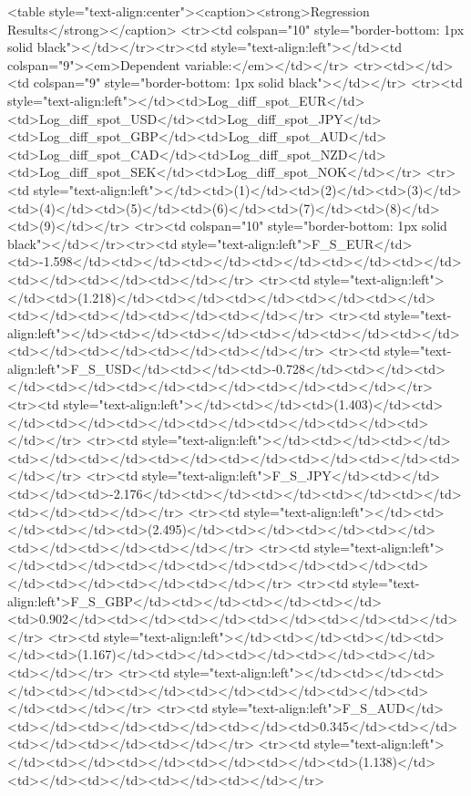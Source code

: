 <table style="text-align:center"><caption><strong>Regression Results</strong></caption>
<tr><td colspan="10" style="border-bottom: 1px solid black"></td></tr><tr><td style="text-align:left"></td><td colspan="9"><em>Dependent variable:</em></td></tr>
<tr><td></td><td colspan="9" style="border-bottom: 1px solid black"></td></tr>
<tr><td style="text-align:left"></td><td>Log_diff_spot_EUR</td><td>Log_diff_spot_USD</td><td>Log_diff_spot_JPY</td><td>Log_diff_spot_GBP</td><td>Log_diff_spot_AUD</td><td>Log_diff_spot_CAD</td><td>Log_diff_spot_NZD</td><td>Log_diff_spot_SEK</td><td>Log_diff_spot_NOK</td></tr>
<tr><td style="text-align:left"></td><td>(1)</td><td>(2)</td><td>(3)</td><td>(4)</td><td>(5)</td><td>(6)</td><td>(7)</td><td>(8)</td><td>(9)</td></tr>
<tr><td colspan="10" style="border-bottom: 1px solid black"></td></tr><tr><td style="text-align:left">F_S_EUR</td><td>-1.598</td><td></td><td></td><td></td><td></td><td></td><td></td><td></td><td></td></tr>
<tr><td style="text-align:left"></td><td>(1.218)</td><td></td><td></td><td></td><td></td><td></td><td></td><td></td><td></td></tr>
<tr><td style="text-align:left"></td><td></td><td></td><td></td><td></td><td></td><td></td><td></td><td></td><td></td></tr>
<tr><td style="text-align:left">F_S_USD</td><td></td><td>-0.728</td><td></td><td></td><td></td><td></td><td></td><td></td><td></td></tr>
<tr><td style="text-align:left"></td><td></td><td>(1.403)</td><td></td><td></td><td></td><td></td><td></td><td></td><td></td></tr>
<tr><td style="text-align:left"></td><td></td><td></td><td></td><td></td><td></td><td></td><td></td><td></td><td></td></tr>
<tr><td style="text-align:left">F_S_JPY</td><td></td><td></td><td>-2.176</td><td></td><td></td><td></td><td></td><td></td><td></td></tr>
<tr><td style="text-align:left"></td><td></td><td></td><td>(2.495)</td><td></td><td></td><td></td><td></td><td></td><td></td></tr>
<tr><td style="text-align:left"></td><td></td><td></td><td></td><td></td><td></td><td></td><td></td><td></td><td></td></tr>
<tr><td style="text-align:left">F_S_GBP</td><td></td><td></td><td></td><td>0.902</td><td></td><td></td><td></td><td></td><td></td></tr>
<tr><td style="text-align:left"></td><td></td><td></td><td></td><td>(1.167)</td><td></td><td></td><td></td><td></td><td></td></tr>
<tr><td style="text-align:left"></td><td></td><td></td><td></td><td></td><td></td><td></td><td></td><td></td><td></td></tr>
<tr><td style="text-align:left">F_S_AUD</td><td></td><td></td><td></td><td></td><td>0.345</td><td></td><td></td><td></td><td></td></tr>
<tr><td style="text-align:left"></td><td></td><td></td><td></td><td></td><td>(1.138)</td><td></td><td></td><td></td><td></td></tr>
